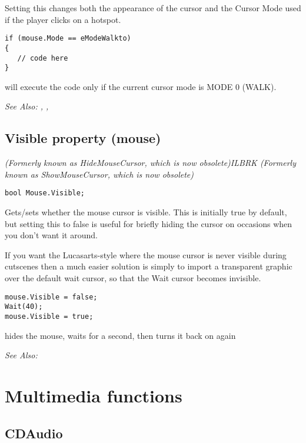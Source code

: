 Setting this changes both the appearance of the cursor and the Cursor Mode
used if the player clicks on a hotspot.

\begin{verbatim}
if (mouse.Mode == eModeWalkto)
{
   // code here
}
\end{verbatim}
will execute the code only if the current cursor mode is MODE 0 (WALK).

\it{See Also:} ,
, 


\subsection{Visible property (mouse)}\label{Mouse.Visible}%

\it{(Formerly known as HideMouseCursor, which is now obsolete)}ILBRK
\it{(Formerly known as ShowMouseCursor, which is now obsolete)}

\begin{verbatim}
bool Mouse.Visible;
\end{verbatim}
Gets/sets whether the mouse cursor is visible. This is initially true by default,
but setting this to false is useful for briefly hiding the cursor on occasions
when you don't want it around.

If you want the Lucasarts-style where the mouse cursor is never visible during cutscenes
then a much easier solution is simply to import a transparent graphic over the default
wait cursor, so that the Wait cursor becomes invisible.

\begin{verbatim}
mouse.Visible = false;
Wait(40);
mouse.Visible = true;
\end{verbatim}
hides the mouse, waits for a second, then turns it back on again

\it{See Also:} 


\section{Multimedia functions}%

\subsection{CDAudio}\label{CDAudio}%

